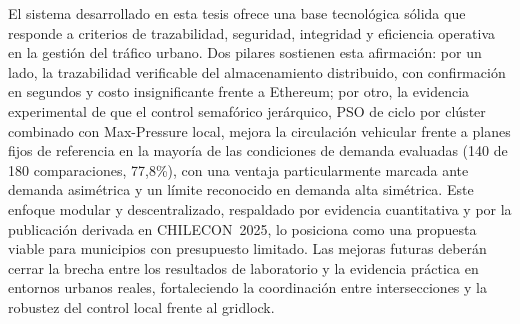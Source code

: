 El sistema desarrollado en esta tesis ofrece una base tecnológica sólida que responde a
criterios de trazabilidad, seguridad, integridad y eficiencia operativa en la gestión del
tráfico urbano. Dos pilares sostienen esta afirmación: por un lado, la trazabilidad
verificable del almacenamiento distribuido, con confirmación en segundos y costo
insignificante frente a Ethereum; por otro, la evidencia experimental de que el control
semafórico jerárquico, PSO de ciclo por clúster combinado con Max-Pressure local, mejora
la circulación vehicular frente a planes fijos de referencia en la mayoría de las
condiciones de demanda evaluadas (140 de 180 comparaciones, 77,8\%), con una ventaja
particularmente marcada ante demanda asimétrica y un límite reconocido en demanda alta
simétrica. Este enfoque modular y descentralizado, respaldado por evidencia cuantitativa y
por la publicación derivada en CHILECON~2025, lo posiciona como una propuesta
viable para municipios con presupuesto limitado. Las mejoras futuras deberán cerrar la brecha
entre los resultados de laboratorio y la evidencia práctica en entornos urbanos reales,
fortaleciendo la coordinación entre intersecciones y la robustez del control local frente al
gridlock.
